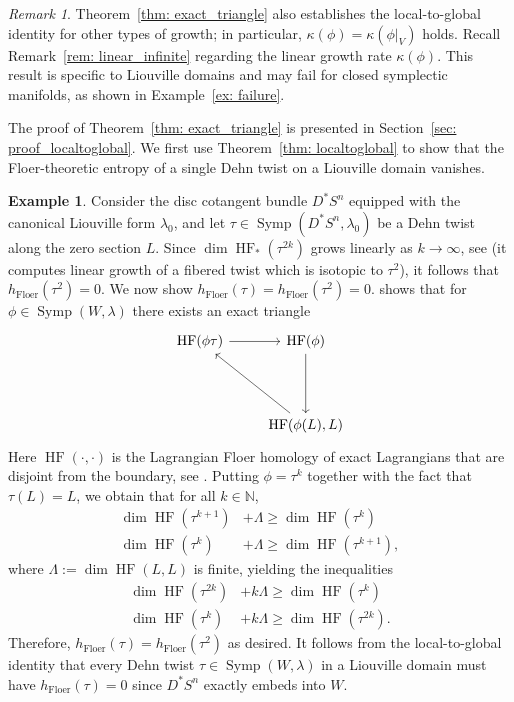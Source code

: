\documentclass[12pt]{article}
\renewcommand{\ge}{\geqslant}
\theoremstyle{theorem}
\theoremstyle{definition}
\newtheorem{example}[theorem]{Example}
\theoremstyle{remark}
\newtheorem{remark}[theorem]{Remark}
\numberwithin{equation}{section}
\newcommand{\N}{{\mathbb{N}}}
\DeclareMathOperator{\floer}{Floer}
\DeclareMathOperator{\Symp}{Symp}
\DeclareMathOperator{\HF}{HF}
\begin{document}
\begin{remark}\label{rem: local_to_global}
	Theorem~\ref{thm: exact_triangle} also establishes the local-to-global identity for other types of growth;
	in particular, $\kappa(\phi)=\kappa(\phi|_V)$ holds.
Recall Remark~\ref{rem: linear_infinite} regarding the linear growth rate $\kappa(\phi)$.
	This result is specific to Liouville domains and may fail for closed symplectic manifolds, as shown in Example~\ref{ex: failure}.
\end{remark}
The proof of Theorem~\ref{thm: exact_triangle} is presented in Section~\ref{sec: proof_localtoglobal}.
We first use Theorem~\ref{thm: localtoglobal} to show that the Floer-theoretic entropy of a single Dehn twist on a Liouville domain vanishes.
\begin{example}\label{ex: singledehn}
Consider the disc cotangent bundle $D^*S^n$ equipped with the canonical Liouville form $\lambda_0$, and let $\tau\in \Symp(D^*S^n,\lambda_0)$ be a Dehn twist along the zero section $L$.
Since $\dim \HF_*(\tau^{2k})$ grows linearly as $k\to \infty$, see \cite[Proposition~4.7]{Ul19} (it computes linear growth of a fibered twist which is isotopic to $\tau^2$), it follows that $h_{\floer}(\tau^2)=0$.
We now show $h_{\floer}(\tau)=h_{\floer}(\tau^2)=0$.
\cite[Theorem~4.2]{Se01} shows that for $\phi\in\Symp(W,\lambda)$ there exists an exact triangle
\begin{equation}\label{eq: seidel_exact_tri}
\begin{tikzcd}[row sep=1.5cm]
\HF(\phi \tau)  \arrow[r] & \HF(\phi) \arrow[d]\\
 & \arrow[ul] \HF(\phi(L),L)  
\end{tikzcd}
\end{equation}
Here $\HF(\cdot,\cdot)$ is the Lagrangian Floer homology of exact Lagrangians that are disjoint from the boundary, see \cite[Section~3]{Se01_2}.
Putting $\phi=\tau^k$ together with the fact that $\tau(L)=L$, we obtain that for all $k\in \N$,
\begin{equation*}
\begin{split}
	\dim \HF(\tau^{k+1}) &+ \Lambda \ge \dim \HF(\tau^{k}) \\
	\dim \HF(\tau^{k}) &+ \Lambda \ge \dim \HF(\tau^{k+1}),
\end{split}	
\end{equation*}
where $\Lambda:=\dim \HF(L,L)$ is finite, yielding the inequalities 
\begin{equation*}
\begin{split}
	\dim \HF(\tau^{2k}) &+ k\Lambda \ge \dim \HF(\tau^{k}) \\
	\dim \HF(\tau^{k}) &+ k\Lambda \ge \dim \HF(\tau^{2k}).
\end{split}	
\end{equation*}
Therefore, $h_{\floer}(\tau)=h_{\floer}(\tau^2)$ as desired.
It follows from the local-to-global identity that every Dehn twist $\tau\in \Symp(W,\lambda)$ in a Liouville domain must have $h_{\floer}(\tau)=0$ since $D^*S^n$ exactly embeds into $W$.
\end{example} 
\end{document}
